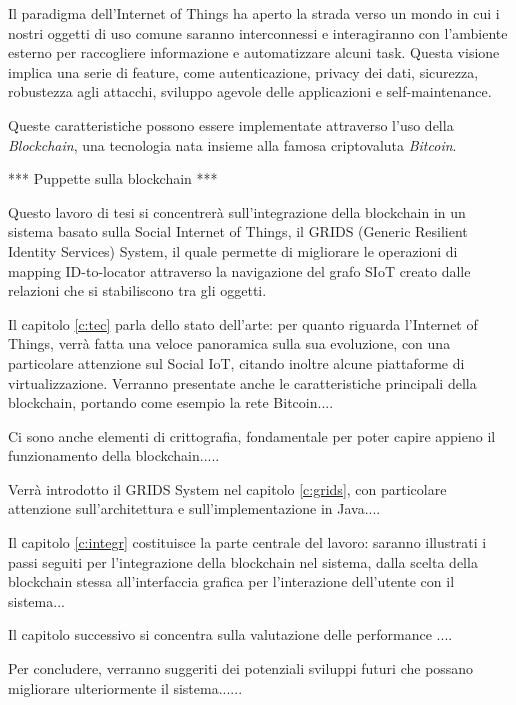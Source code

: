 Il paradigma dell'Internet of Things ha aperto la strada verso un mondo in cui i nostri oggetti di uso comune saranno interconnessi e interagiranno con l'ambiente esterno per raccogliere informazione e automatizzare alcuni task. Questa visione implica una serie di feature, come autenticazione, privacy dei dati, sicurezza, robustezza agli attacchi, sviluppo agevole delle applicazioni e self-maintenance.\cite{Fernandez-Carames2018}

Queste caratteristiche possono essere implementate attraverso l'uso della \textit{Blockchain}, una tecnologia nata insieme alla famosa criptovaluta \textit{Bitcoin}. 

*** Puppette sulla blockchain ***

Questo lavoro di tesi si concentrerà sull'integrazione della blockchain in un sistema basato sulla Social Internet of Things, il GRIDS (Generic Resilient Identity Services) System, il quale permette di migliorare le operazioni di mapping ID-to-locator attraverso la navigazione del grafo SIoT creato dalle relazioni che si stabiliscono tra gli oggetti.

Il capitolo \ref{c:tec} parla dello stato dell'arte: per quanto riguarda l'Internet of Things, verrà fatta una veloce panoramica sulla sua evoluzione, con una particolare attenzione sul Social IoT, citando inoltre alcune piattaforme di virtualizzazione. Verranno presentate anche le caratteristiche principali della blockchain, portando come esempio la rete Bitcoin.... 

Ci sono anche elementi di crittografia, fondamentale per poter capire appieno il funzionamento della blockchain.....

Verrà introdotto il GRIDS System nel capitolo \ref{c:grids}, con particolare attenzione sull'architettura e sull'implementazione in Java....

Il capitolo \ref{c:integr} costituisce la parte centrale del lavoro: saranno illustrati i passi seguiti per l'integrazione della blockchain nel sistema, dalla scelta della blockchain stessa all'interfaccia grafica per l'interazione dell'utente con il sistema...

Il capitolo successivo si concentra sulla valutazione delle performance ....

Per concludere, verranno suggeriti dei potenziali sviluppi futuri che possano migliorare ulteriormente il sistema......